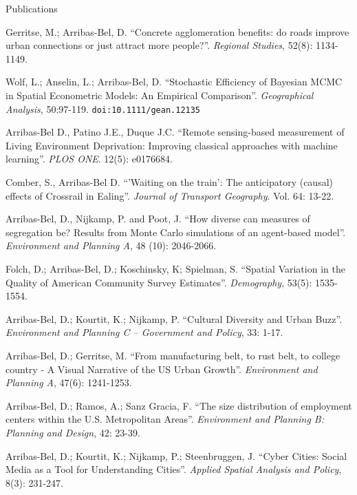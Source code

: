 \documentclass[12pt,2up]{article}
\begin{document}
\begin{cv}{}
\begin{cvlist}{Publications}
\item[] 
Gerritse, M.; Arribas-Bel, D. ``Concrete agglomeration benefits: do roads
improve urban connections or just attract more people?''. \emph{Regional
Studies}, 52(8): 1134-1149.
\item[] 
Wolf, L.; Anselin, L.; Arribas-Bel, D. ``Stochastic Efficiency of Bayesian
MCMC in Spatial Econometric Models: An Empirical Comparison''.
\emph{Geographical Analysis}, 50:97-119. \texttt{doi:10.1111/gean.12135}
\item[] Arribas-Bel D., Patino J.E., Duque J.C. ``Remote
    sensing-based measurement of Living Environment Deprivation: Improving
    classical approaches with machine learning''. \emph{PLOS ONE}. 12(5): e0176684.
\item[] Comber, S., Arribas-Bel D. ``'Waiting on the train': The
    anticipatory (causal) effects of Crossrail in Ealing''. \emph{Journal of
    Transport Geography}. Vol. 64: 13-22.
\item[\textit{2016}] Arribas-Bel, D., Nijkamp, P. and Poot, J. ``How
    diverse can measures of segregation be? Results from Monte Carlo
    simulations of an agent-based model''. \emph{Environment and Planning A},
    48 (10): 2046-2066.
\item[] Folch, D.; Arribas-Bel, D.; Koschinsky, K; Spielman,
    S. ``Spatial Variation in the Quality of American Community Survey
    Estimates''. \emph{Demography}, 53(5): 1535-1554.
\item[2015] Arribas-Bel, D.; Kourtit, K.; Nijkamp, P. ``Cultural Diversity and
    Urban Buzz''. \emph{Environment and Planning C -- Government and
    Policy}, 33: 1-17.

\item[] Arribas-Bel, D.; Gerritse, M. ``From manufacturing
    belt, to rust belt, to college
    country - A Visual Narrative of the US Urban Growth''.
    \emph{Environment and Planning A}, 47(6): 1241-1253.

\item[] Arribas-Bel, D.; Ramos, A.; Sanz Gracia, F. ``The size distribution of employment centers within the U.S. Metropolitan Areas''.
    \emph{Environment and Planning B: Planning and Design}, 42: 23-39.

\item[] Arribas-Bel, D.; Kourtit, K.; Nijkamp, P.; Steenbruggen, J. ``Cyber Cities: Social Media as a Tool for Understanding Cities''.
\emph{Applied Spatial Analysis and Policy}, 8(3): 231-247.


\end{cvlist}
\end{cv}
\end{document}
